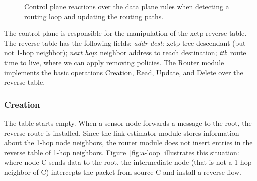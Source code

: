 \begin{figure}[!ht]
\centerline{
\qquad
\qquad \qquad
\qquad
} \caption{Control plane reactions over the data plane rules when detecting a routing loop and updating the routing paths.}
\label{fig:loop}
\end{figure}

The control plane is responsible for the manipulation of the \ac{xctp} reverse table. The reverse table has the following fields: \textit{addr dest}: \ac{xctp} tree descendant (but not 1-hop neighbor); \textit{next hop}: neighbor address to reach destination; \textit{\acs{ttl}}: route time to live, where we can apply removing policies. The Router module implements the basic operations Creation, Read, Update, and Delete over the reverse table.

\subsubsection{Creation} The table starts empty. When a sensor node forwards a message to the root, the reverse route is installed. Since the link estimator module stores information about the 1-hop node neighbors, the router module does not insert entries in the reverse table of 1-hop neighbors. Figure~\ref{fig:a-loop} illustrates this situation: where node C sends data to the root, the intermediate node (that is not a 1-hop neighbor of C) intercepts the packet from source C and install a reverse flow.

